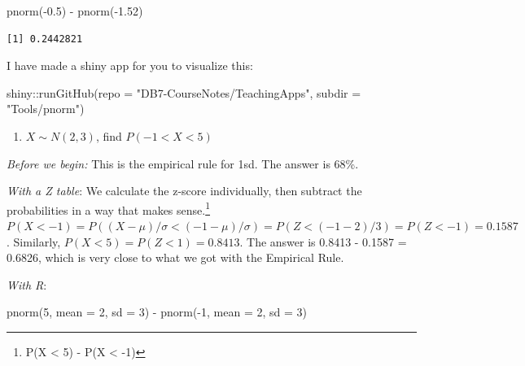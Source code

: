 \documentclass[
  letterpaper,
  DIV=11,
  numbers=noendperiod,
  oneside]{scrreprt}
\newenvironment{Shaded}{\begin{snugshade}}{\end{snugshade}}
\newcommand{\AttributeTok}[1]{\textcolor[rgb]{0.40,0.45,0.13}{#1}}
\newcommand{\DecValTok}[1]{\textcolor[rgb]{0.68,0.00,0.00}{#1}}
\newcommand{\FloatTok}[1]{\textcolor[rgb]{0.68,0.00,0.00}{#1}}
\newcommand{\FunctionTok}[1]{\textcolor[rgb]{0.28,0.35,0.67}{#1}}
\newcommand{\NormalTok}[1]{\textcolor[rgb]{0.00,0.23,0.31}{#1}}
\newcommand{\SpecialCharTok}[1]{\textcolor[rgb]{0.37,0.37,0.37}{#1}}
\newcommand{\StringTok}[1]{\textcolor[rgb]{0.13,0.47,0.30}{#1}}
\providecommand{\tightlist}{%
  \setlength{\itemsep}{0pt}\setlength{\parskip}{0pt}}\usepackage{longtable,booktabs,array}
\begin{document}
\begin{Shaded}
\begin{Highlighting}[]
\FunctionTok{pnorm}\NormalTok{(}\SpecialCharTok{{-}}\FloatTok{0.5}\NormalTok{) }\SpecialCharTok{{-}} \FunctionTok{pnorm}\NormalTok{(}\SpecialCharTok{{-}}\FloatTok{1.52}\NormalTok{)}
\end{Highlighting}
\end{Shaded}

\begin{verbatim}
[1] 0.2442821
\end{verbatim}

I have made a shiny app for you to visualize this:

\begin{Shaded}
\begin{Highlighting}[]
\NormalTok{shiny}\SpecialCharTok{::}\FunctionTok{runGitHub}\NormalTok{(}\AttributeTok{repo =} \StringTok{"DB7{-}CourseNotes/TeachingApps"}\NormalTok{, }
    \AttributeTok{subdir =} \StringTok{"Tools/pnorm"}\NormalTok{)}
\end{Highlighting}
\end{Shaded}

\begin{enumerate}
\def\labelenumi{\arabic{enumi}.}
\setcounter{enumi}{5}
\tightlist
\item
  \(X \sim N(2,3)\), find \(P(-1 < X < 5)\)
\end{enumerate}

\emph{Before we begin:} This is the empirical rule for 1sd. The answer
is 68\%.

\emph{With a Z table}: We calculate the z-score individually, then
subtract the probabilities in a way that makes sense.\footnote{P(X
  \textless{} 5) - P(X \textless{} -1)}
\(P(X < -1) = P((X-\mu)/\sigma < (-1 - \mu)/\sigma) = P(Z < (-1 - 2)/3) = P(Z < -1) = 0.1587\).
Similarly, \(P(X < 5) = P(Z < 1) = 0.8413\). The answer is 0.8413 -
0.1587 = 0.6826, which is very close to what we got with the Empirical
Rule.

\emph{With R}:

\begin{Shaded}
\begin{Highlighting}[]
\FunctionTok{pnorm}\NormalTok{(}\DecValTok{5}\NormalTok{, }\AttributeTok{mean =} \DecValTok{2}\NormalTok{, }\AttributeTok{sd =} \DecValTok{3}\NormalTok{) }\SpecialCharTok{{-}} \FunctionTok{pnorm}\NormalTok{(}\SpecialCharTok{{-}}\DecValTok{1}\NormalTok{, }\AttributeTok{mean =} \DecValTok{2}\NormalTok{, }\AttributeTok{sd =} \DecValTok{3}\NormalTok{)}
\end{Highlighting}
\end{Shaded}
\end{document}
